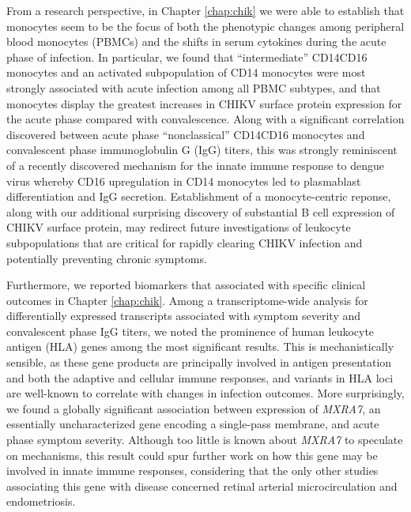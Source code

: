 From a research perspective, in Chapter \ref{chap:chik} we were able to establish that monocytes seem to be the focus of both the phenotypic changes among peripheral blood monocytes (PBMCs) and the shifts in serum cytokines during the acute phase of infection. In particular, we found that ``intermediate'' CD14\sups{++}\allowbreak CD16\sups{+} monocytes and an activated subpopulation of CD14\sups{+} monocytes were most strongly associated with acute infection among all PBMC subtypes, and that monocytes display the greatest increases in CHIKV surface protein expression for the acute phase compared with convalescence. Along with a significant correlation discovered between acute phase ``nonclassical'' CD14\sups{+}CD16\sups{++} monocytes and convalescent phase immunoglobulin G (IgG) titers, this was strongly reminiscent of a recently discovered mechanism for the innate immune response to dengue virus whereby CD16 upregulation in CD14\sups{+} monocytes led to plasmablast differentiation and IgG secretion.\autocite{Kwissa2014} Establishment of a monocyte-centric reponse, along with our additional surprising discovery of substantial B cell expression of CHIKV surface protein, may redirect future investigations of leukocyte subpopulations that are critical for rapidly clearing CHIKV infection and potentially preventing chronic symptoms.

Furthermore, we reported biomarkers that associated with specific clinical outcomes in Chapter \ref{chap:chik}. Among a transcriptome-wide analysis for differentially expressed transcripts associated with symptom severity and convalescent phase IgG titers, we noted the prominence of human leukocyte antigen (HLA) genes among the most significant results. This is mechanistically sensible, as these gene products are principally involved in antigen presentation and both the adaptive and cellular immune responses, and variants in HLA loci are well-known to correlate with changes in infection outcomes. More surprisingly, we found a globally significant association between expression of \emph{MXRA7}, an essentially uncharacterized gene encoding a single-pass membrane, and acute phase symptom severity. Although too little is known about \emph{MXRA7} to speculate on mechanisms, this result could spur further work on how this gene may be involved in innate immune responses, considering that the only other studies associating this gene with disease concerned retinal arterial microcirculation and endometriosis.\autocite{Sim2013,Veiga-Castelli2010}

